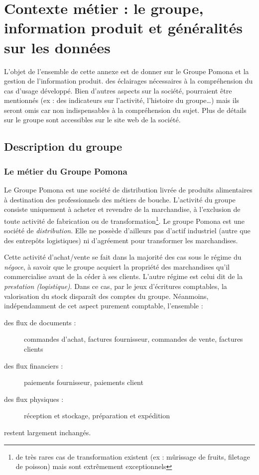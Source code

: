\chapter{Contexte métier : le groupe, information produit et généralités sur les données}
    \label{business_chap}
    \large
    L'objet de l'ensemble de cette annexe est de donner sur le Groupe Pomona et la gestion de l'information produit. des éclairages nécessaires à la compréhension du cas d'usage développé.
    Bien d'autres aspects sur la société, pourraient être mentionnés (ex : des indicateurs sur l'activité, l'histoire du groupe\dots) mais ils seront omis car non indispensables à la compréhension du sujet.
    Plus de détails sur le groupe sont accessibles sur le site web de la société\cite{site_pomona}.
    \normalsize   

    \section{Description du groupe}

 

        \subsection{Le métier du Groupe Pomona}
        \label{business}

        Le Groupe Pomona est une société de distribution livrée de produits alimentaires à destination des professionnels des métiers de bouche.
        L'activité du groupe consiste uniquement à acheter et revendre de la marchandise, à l'exclusion de toute activité de fabrication ou de transformation\footnote{de très rares cas de transformation existent (ex : mûrissage de fruits, filetage de poisson) mais sont extrêmement exceptionnels}. Le groupe Pomona est une société de \emph{distribution}. Elle ne possède d'ailleurs pas d'actif industriel (autre que des entrepôts logistiques) ni d'agréement pour transformer les marchandises.        
        
        Cette activité d'achat/vente se fait dans la majorité des cas sous le régime du \emph{négoce}, à savoir que le groupe acquiert la propriété des marchandises qu'il commercialise avant de la céder à ses clients.
        L'autre régime est celui dit de la \emph{prestation (logistique)}.
        Dans ce cas, par le jeux d'écritures comptables, la valorisation du stock disparaît des comptes du groupe.
        Néanmoins, indépendamment de cet aspect purement comptable, l'ensemble :
        \begin{description}
            \item[des flux de documents :] commandes d'achat, factures fournisseur, commandes de vente, factures clients
            \item[des flux financiers :] paiements fournisseur, paiements client
            \item[des flux physiques :] réception et stockage, préparation et expédition
        \end{description}
        restent largement inchangés.
        
